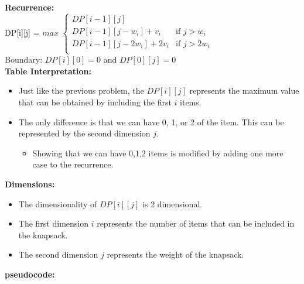 \documentclass{article}[12pt]
\begin{document}
\noindent\textbf{Recurrence:} \\
DP[i][j] = $max$
$\begin{cases}
     DP[i-1][j] \\
     DP[i-1][j-w_i] + v_i & \text{if } j > w_i \\
     DP[i-1][j-2w_i] + 2v_i & \text{if } j > 2w_i \\
  
\end{cases}$ \\

Boundary: $DP[i][0] = 0$ and $DP[0][j] = 0$ \\

\noindent\textbf{Table Interpretation:} \\
\begin{itemize}
  \item Just like the previous problem, the $DP[i][j]$ represents the maximum value that can be obtained by including the first $i$ items.
  \item The only difference is that we can have 0, 1, or 2 of the item. This can be represented by the second dimension $j$.
    \begin{itemize}
      \item Showing that we can have 0,1,2 items is modified by adding one more case to the recurrence.
    \end{itemize}
\end{itemize}
\noindent\textbf{Dimensions:} \\
\begin{itemize}
  \item The dimensionality of $DP[i][j]$ is 2 dimensional.
  \item The first dimension $i$ represents the number of items that can be included in the knapsack.
  \item The second dimension $j$ represents the weight of the knapsack.
  
\end{itemize}

\pagebreak 
\noindent\textbf{pseudocode:} \\
\end{document}
